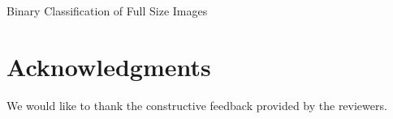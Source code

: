 \documentclass{aci}
\begin{document}
\begin{table}[ht]
  \centering
  \caption{Binary Classification of Full Size Images}
  \label{table:exp1_full}
  
\end{table}

\section*{Acknowledgments}
We would like to thank the constructive feedback provided by the reviewers.



\end{document}
